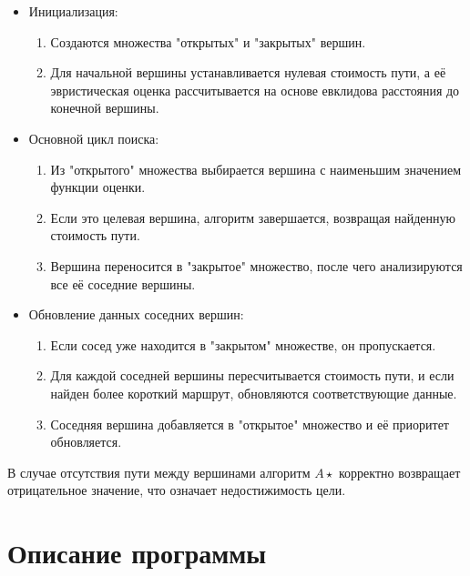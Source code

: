 \documentclass[12pt]{article}
\begin{document}
\begin{itemize}
    \item Инициализация:
    \begin{enumerate}
        \item Создаются множества "открытых" и "закрытых" вершин.
        \item Для начальной вершины устанавливается нулевая стоимость пути, а её эвристическая оценка рассчитывается на основе евклидова расстояния до конечной вершины.
    \end{enumerate}

    \item Основной цикл поиска:
    \begin{enumerate}
        \item Из "открытого" множества выбирается вершина с наименьшим значением функции оценки.
        \item Если это целевая вершина, алгоритм завершается, возвращая найденную стоимость пути.
        \item Вершина переносится в "закрытое" множество, после чего анализируются все её соседние вершины.
    \end{enumerate}

    \item Обновление данных соседних вершин:
    \begin{enumerate}
        \item Если сосед уже находится в "закрытом" множестве, он пропускается.
        \item Для каждой соседней вершины пересчитывается стоимость пути, и если найден более короткий маршрут, обновляются соответствующие данные.
        \item Соседняя вершина добавляется в "открытое" множество и её приоритет обновляется.
    \end{enumerate}
\end{itemize}

В случае отсутствия пути между вершинами алгоритм $A\star$ корректно возвращает отрицательное значение, что означает недостижимость цели.

\newpage
\section*{Описание программы}
\end{document}

